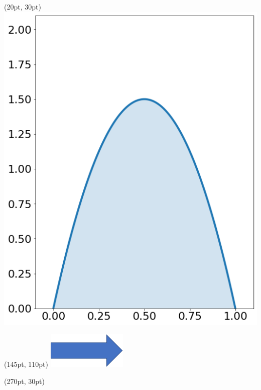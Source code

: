 \documentclass[aspectratio=169,unicode,dvipdfmx,14pt]{beamer}
\begin{document}
\begin{frame}
\begin{textblock*}{0.4\linewidth}(20pt, 30pt)
    \centering
    \includegraphics[width=\linewidth]{beta_2_2.png}
\end{textblock*}
\begin{textblock*}{0.4\linewidth}(145pt, 110pt)
    \centering
    \includegraphics[width=0.3\linewidth]{blue_arrow.png}
\end{textblock*}
\begin{textblock*}{0.4\linewidth}(270pt, 30pt)
    \centering

\end{textblock*}
\end{frame}
\end{document}
